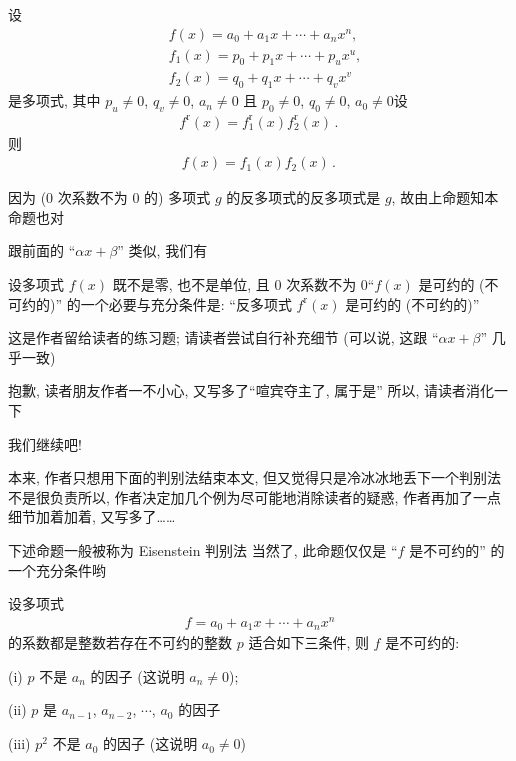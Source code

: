 \begin{proposition}
    设
    \begin{align*}
         & f(x) = a_0 + a_1 x + \cdots + a_n x^n,    \\
         & f_1 (x) = p_0 + p_1 x + \cdots + p_u x^u, \\
         & f_2 (x) = q_0 + q_1 x + \cdots + q_v x^v
    \end{align*}
    是多项式, 其中 $p_u \neq 0$, $q_v \neq 0$, $a_n \neq 0$ 且 $p_0 \neq 0$, $q_0 \neq 0$, $a_0 \neq 0$\period 设
    \begin{align*}
        f^{\mathrm{r}} (x) = f_1^{\mathrm{r}} (x) f_2^{\mathrm{r}} (x) \period
    \end{align*}
    则
    \begin{align*}
        f(x) = f_1 (x) f_2 (x) \period
    \end{align*}
\end{proposition}

\begin{pf}
    因为 ($0$ 次系数不为 $0$ 的) 多项式 $g$ 的反多项式的反多项式是 $g$, 故由上命题知本命题也对\period
\end{pf}

跟前面的 ``$\alpha x + \beta$'' 类似, 我们有
\begin{proposition}
    设多项式 $f(x)$ 既不是零, 也不是单位, 且 $0$ 次系数不为 $0$\period ``$f(x)$ 是可约的 (不可约的)'' 的一个必要与充分条件是: ``反多项式 $f^{\mathrm{r}} (x)$ 是可约的 (不可约的)''\period
\end{proposition}

\begin{pf}
    这是作者留给读者的练习题; 请读者尝试自行补充细节 (可以说, 这跟 ``$\alpha x + \beta$'' 几乎一致)\period
\end{pf}

抱歉, 读者朋友\period 作者一不小心, 又写多了\period ``喧宾夺主了, 属于是\period '' 所以, 请读者消化一下\period

\myLine

我们继续吧!

本来, 作者只想用下面的判别法结束本文, 但又觉得只是冷冰冰地丢下一个判别法不是很负责\period 所以, 作者决定加几个例\period 为尽可能地消除读者的疑惑, 作者再加了一点细节\period 加着加着, 又写多了……

下述命题一般被称为 Eisenstein 判别法 \period 当然了, 此命题仅仅是 ``$f$ 是不可约的'' 的一个充分条件哟\period

\begin{proposition}
    设多项式
    \begin{align*}
        f = a_0 + a_1 x + \cdots + a_n x^n
    \end{align*}
    的系数都是整数\period 若存在不可约的整数 $p$ 适合如下三条件, 则 $f$ 是不可约的:

    (i) $p$ 不是 $a_n$ 的因子 (这说明 $a_n \neq 0$);

    (ii) $p$ 是 $a_{n-1}$, $a_{n-2}$, $\cdots$, $a_0$ 的因子\period

    (iii) $p^2$ 不是 $a_0$ 的因子 (这说明 $a_0 \neq 0$)\period
\end{proposition}

